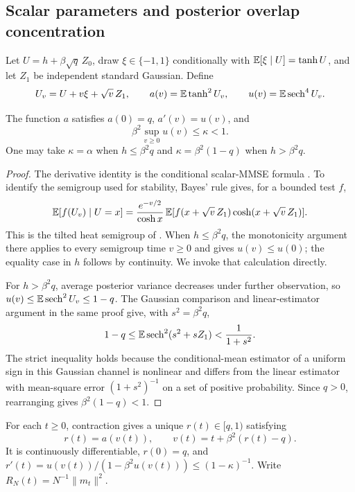 \documentclass[11pt,reqno]{amsart}
\newcommand{\sech}{\operatorname{sech}}
\begin{document}
\subsection{Scalar parameters and posterior overlap concentration}\label{sec:scalar-summary}

Let $U=h+\beta\sqrt q\,Z_0$, draw $\xi\in\{-1,1\}$ conditionally with ${\mathbb{E}}[\xi\mid U]=\tanh U$, and let $Z_1$ be independent standard Gaussian. Define
\begin{equation}\label{eq:scalar-observation-law}
 U_v=U+v\xi+\sqrt v\,Z_1,
 \qquad a(v)=\bbE\tanh^2U_v,
 \qquad u(v)=\bbE\sech^4U_v.
\end{equation}

\begin{lem}\label{lem:scalar-stability}
The function $a$ satisfies $a(0)=q$, $a'(v)=u(v)$, and
\[
 \beta^2\sup_{v\ge0}u(v)\le\kappa<1.
\]
One may take $\kappa=\alpha$ when $h\le\beta^2q$ and $\kappa=\beta^2(1-q)$ when $h>\beta^2q$.
\end{lem}
\begin{proof}
The derivative identity is the conditional scalar-MMSE formula \cite[Proposition~9 and Corollary~2]{guo2011estimation}. To identify the semigroup used for stability, Bayes' rule gives, for a bounded test $f$,
\[
 {\mathbb{E}}[f(U_v)\mid U=x]
 =\frac{e^{-v/2}}{\cosh x}\,
      {\mathbb{E}}[f(x+\sqrt v\,Z_1)\cosh(x+\sqrt v\,Z_1)].
\]
This is the tilted heat semigroup of \cite[Section~2.1, proof of Lemma~2.1]{kusuoka2026quantitative}. When $h\le\beta^2q$, the monotonicity argument there applies to every semigroup time $v\ge0$ and gives $u(v)\le u(0)$; the equality case in $h$ follows by continuity. We invoke that calculation directly.

For $h>\beta^2q$, average posterior variance decreases under further observation, so $u(v)\le\bbE\sech^2U_v\le1-q$. The Gaussian comparison and linear-estimator argument in the same proof give, with $s^2=\beta^2q$,
\[
 1-q\le\bbE\sech^2(s^2+sZ_1)<\frac1{1+s^2}.
\]
The strict inequality holds because the conditional-mean estimator of a uniform sign in this Gaussian channel is nonlinear and differs from the linear estimator with mean-square error $(1+s^2)^{-1}$ on a set of positive probability. Since $q>0$, rearranging gives $\beta^2(1-q)<1$.
\end{proof}

For each $t\ge0$, contraction gives a unique $r(t)\in[q,1)$ satisfying
\begin{equation}\label{eq:observed-fixed-point}
 r(t)=a(v(t)),\qquad v(t)=t+\beta^2(r(t)-q).
\end{equation}
It is continuously differentiable, $r(0)=q$, and
$r'(t)=u(v(t))/(1-\beta^2u(v(t)))\le(1-\kappa)^{-1}$.
Write $R_N(t)=N^{-1}\|m_t\|^2$.
\end{document}
